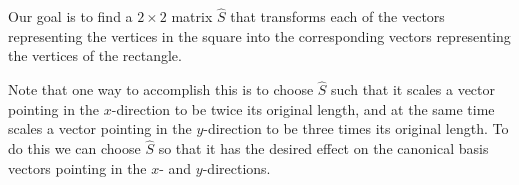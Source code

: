 \documentclass[12pt]{article}
\newcommand{\nin}{\noindent}
\newcommand{\vthree}{\vspace{3mm}}
\begin{document}
\vthree

\nin Our goal is to find a $2 \times 2$ matrix $\hat{S}$ that transforms each of the vectors representing the vertices in the square into the corresponding vectors representing the vertices of the rectangle.

\vthree

\nin Note that one way to accomplish this is to choose $\hat{S}$ such that it scales a vector pointing in the $x$-direction to be twice its original length, and at the same time scales a vector pointing in the $y$-direction to be three times its original length.  To do this we can choose $\hat{S}$ so that it has the desired effect on the canonical basis vectors pointing in the $x$- and $y$-directions.

\vspace{10mm}
\end{document}
